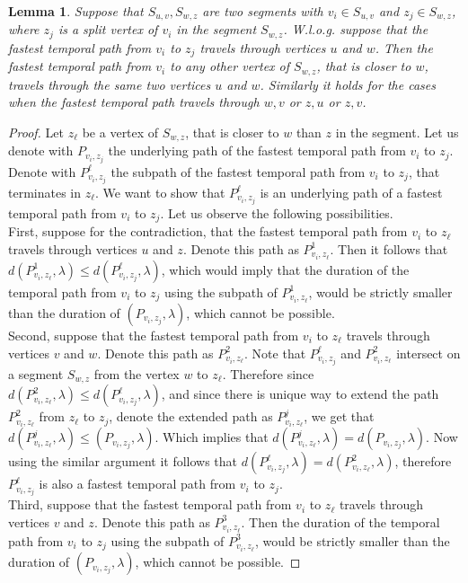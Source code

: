 \documentclass[11pt,a4paper]{article}
\newtheorem{lemma}[theorem]{Lemma}
\theoremstyle{remark}
\theoremstyle{definition}
\begin{document}
\begin{lemma}\label{lemma:FPT-unlabeldPaths-01}
    Suppose that
    $S_{u,v}, S_{w,z}$ are two segments with $ v_i \in S_{u,v}$ and $z_j \in S_{w,z}$,
    where $z_j$ is a split vertex of $v_i$ in the segment $S_{w,z}$.
    W.l.o.g. suppose that the fastest temporal path from $v_i$ to $z_j$ travels through vertices $u$ and $w$.
    Then the fastest temporal path from $v_i$ to any other vertex of $S_{w,z}$, that is closer to $w$,
    travels through the same two vertices $u$ and $w$.
    Similarly it holds for the cases when the fastest temporal path travels through $w,v$ or $z,u$ or $z,v$.
\end{lemma}
\begin{proof}
    Let $z_\ell$ be a vertex of $S_{w,z}$, that is closer to $w$ than $z$ in the segment.
    Let us denote with $P_{v_i,z_j}$ the underlying path of the fastest temporal path from $v_i$ to $z_j$.
    Denote with $P_{v_i,z_j}^\ell$
    the subpath of the fastest temporal path from $v_i$ to $z_j$, that terminates in $z_\ell$.
    We want to show that $P_{v_i,z_j}^\ell$ is an underlying path of a fastest temporal path from $v_i$ to $z_j$.
    Let us observe the following possibilities.
    \\
    First, suppose for the contradiction, that the fastest temporal path from $v_i$ to $z_\ell$ travels through vertices $u$ and $z$.
    Denote this path as $P^1_{v_i,z_\ell}$.
    Then it follows that $d(P^1_{v_i,z_\ell}, \lambda) \leq d(P_{v_i,z_j}^\ell,\lambda)$, which would imply that
    the duration of the temporal path from $v_i$ to $z_j$ using the subpath of $P^1_{v_i,z_\ell}$, would be strictly smaller than the duration of $(P_{v_i,z_j},\lambda)$, which cannot be possible.
    \\
    Second, suppose that the fastest temporal path from $v_i$ to $z_\ell$ travels through vertices $v$ and $w$.
    Denote this path as $P^2_{v_i,z_\ell}$.
    Note that $P_{v_i,z_j}^\ell$ and $P^2_{v_i,z_\ell}$ intersect on a segment $S_{w,z}$ from the vertex $w$ to $z_\ell$.
    Therefore since
    $d(P^2_{v_i,z_\ell}, \lambda) \leq d(P_{v_i,z_j}^\ell,\lambda)$,
    and since there is unique way to
    extend the path $P^2_{v_i,z_\ell}$ from $z_\ell$ to $z_j$, denote the extended path as $P^j_{v_i,z_\ell}$,
    we get that $d(P^j_{v_i,z_\ell}, \lambda) \leq $$(P_{v_i,z_j},\lambda)$.
    Which implies that $d(P^j_{v_i,z_\ell}, \lambda) = d(P_{v_i,z_j}, \lambda)$.
    Now using the similar argument it follows that $d(P_{v_i,z_j}^\ell, \lambda) = d(P^2_{v_i,z_\ell}, \lambda)$,
    therefore $P_{v_i,z_j}^\ell$ is also a fastest temporal path from $v_i$ to $z_j$.
    \\
    Third, suppose that the fastest temporal path from $v_i$ to $z_\ell$ travels through vertices $v$ and $z$.
    Denote this path as $P^3_{v_i,z_\ell}$.
    Then the duration of the temporal path from $v_i$ to $z_j$ using the subpath of $P^3_{v_i,z_\ell}$, would be strictly smaller than the duration of $(P_{v_i,z_j},\lambda)$, which cannot be possible.
\end{proof}
\end{document}

